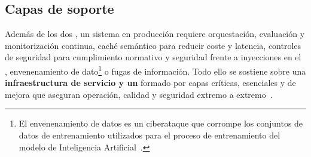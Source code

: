\subsection{Capas de soporte}
Además de los dos , un sistema en producción requiere orquestación, evaluación y monitorización continua, caché semántico para reducir coste y latencia, controles de seguridad para cumplimiento normativo y seguridad frente a inyecciones en el , envenenamiento de dato\footnote{El envenenamiento de datos es un ciberataque que corrompe los conjuntos de datos de entrenamiento utilizados para el proceso de entrenamiento del modelo de Inteligencia Artificial~\cite{concpteo:envdtos}.} o fugas de información. Todo ello se sostiene sobre una \textbf{infraestructura de servicio y un } formado por capas críticas, esenciales y de mejora que aseguran operación, calidad y seguridad extremo a extremo~\cite{book:RAG_SimpleGuide}.
